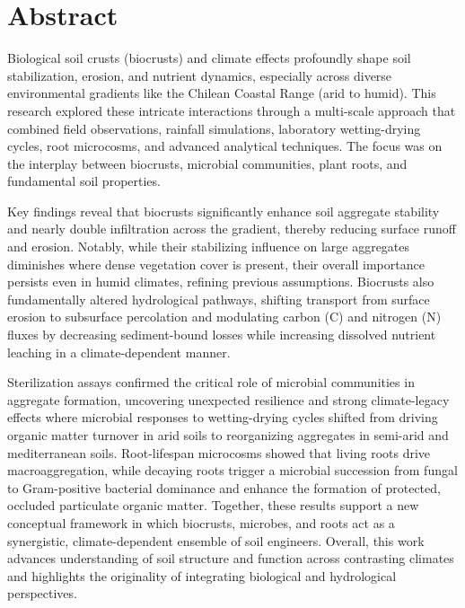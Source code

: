 \chapter*{Abstract}


Biological soil crusts (biocrusts) and climate effects profoundly shape soil stabilization, erosion, and nutrient dynamics, especially across diverse environmental gradients like the Chilean Coastal Range (arid to humid). This research explored these intricate interactions through a multi-scale approach that combined field observations, rainfall simulations, laboratory wetting-drying cycles, root microcosms, and advanced analytical techniques. The focus was on the interplay between biocrusts, microbial communities, plant roots, and fundamental soil properties.

Key findings reveal that biocrusts significantly enhance soil aggregate stability and nearly double infiltration across the gradient, thereby reducing surface runoff and erosion. Notably, while their stabilizing influence on large aggregates diminishes where dense vegetation cover is present, their overall importance persists even in humid climates, refining previous assumptions. Biocrusts also fundamentally altered hydrological pathways, shifting transport from surface erosion to subsurface percolation and modulating carbon (C) and nitrogen (N) fluxes by decreasing sediment-bound losses while increasing dissolved nutrient leaching in a climate-dependent manner.

Sterilization assays confirmed the critical role of microbial communities in aggregate formation, uncovering unexpected resilience and strong climate-legacy effects where microbial responses to wetting-drying cycles shifted from driving organic matter turnover in arid soils to reorganizing aggregates in semi-arid and mediterranean soils. Root-lifespan microcosms showed that living roots drive macroaggregation, while decaying roots trigger a microbial succession from fungal to Gram-positive bacterial dominance and enhance the formation of protected, occluded particulate organic matter. Together, these results support a new conceptual framework in which biocrusts, microbes, and roots act as a synergistic, climate-dependent ensemble of soil engineers. Overall, this work advances understanding of soil structure and function across contrasting climates and highlights the originality of integrating biological and hydrological perspectives.
